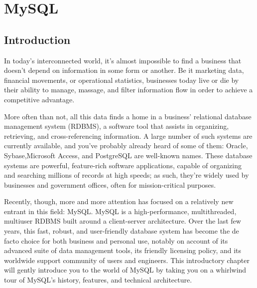 
\section{MySQL}
\subsection{Introduction}
In today's interconnected world, it's almost impossible to find a business that doesn’t depend on information in some form or another. Be it marketing data, financial movements, or operational statistics, businesses today live or die by their ability to manage, massage, and filter information flow in order to achieve a competitive advantage.

More often than not, all this data finds a home in a business’ relational database management system (RDBMS), a software tool that assists in organizing, retrieving, and cross-referencing information. A large number of such systems are currently available, and you’ve probably already heard of some of them: Oracle, Sybase,Microsoft Access, and PostgreSQL are well-known names. These database systems are powerful, feature-rich software applications, capable of organizing and searching millions of records at high speeds; as such, they’re widely used by businesses and government offices, often for mission-critical purposes.

Recently, though, more and more attention has focused on a relatively new entrant in this field: MySQL. MySQL is a high-performance, multithreaded, multiuser RDBMS built around a client-server architecture. Over the last few years, this fast, robust, and user-friendly database system has become the de facto choice for both business and personal use, notably on account of its advanced suite of data management tools, its friendly licensing policy, and its worldwide support community of users and engineers. This introductory chapter will gently introduce you to the world of MySQL by taking you on a whirlwind tour of MySQL’s history, features, and technical architecture.

